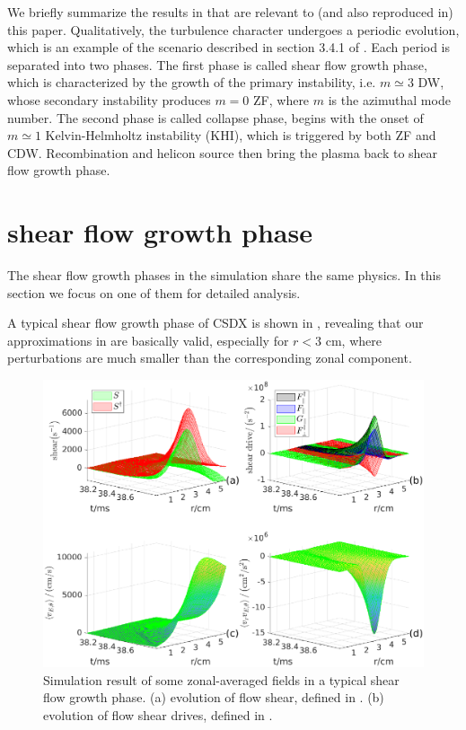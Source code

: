 \documentclass[aps,pre,twocolumn,superscriptaddress]{revtex4-2}
\begin{document}
We briefly summarize the results in \cite{Lang_2019} that are relevant to (and also reproduced in) this paper. Qualitatively, the turbulence character undergoes a periodic evolution, which is an example of the scenario described in section 3.4.1 of \cite{Diamond_2005}. Each period is separated into two phases. The first phase is called shear flow growth phase, which is characterized by the growth of the primary instability, i.e. $m\simeq3$ DW, whose secondary instability produces $m=0$ ZF, where $m$ is the azimuthal mode number. The second phase is called collapse phase, begins with the onset of $m\simeq1$ Kelvin-Helmholtz instability (KHI), which is triggered by both ZF and CDW. Recombination and helicon source then bring the plasma back to shear flow growth phase.

\section{\label{sec:shear flow growth phase}shear flow growth phase}
The shear flow growth phases in the simulation share the same physics. In this section we focus on one of them for detailed analysis.

A typical shear flow growth phase of CSDX is shown in , revealing that our approximations in  are basically valid, especially for $r<3$ cm, where perturbations are much smaller than the corresponding zonal component.
\begin{figure}[htb]
	\includegraphics[width=3.375 in]{acc_den_drive.eps}
	\caption{
		Simulation result of some zonal-averaged fields in a typical shear flow growth phase. (a) evolution of flow shear, defined in . (b) evolution of flow shear drives, defined in .
		\label{fig:acc_den_drive}	
	}
\end{figure}
\end{document}
